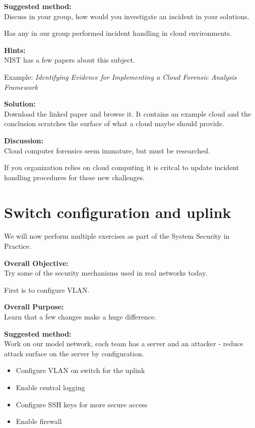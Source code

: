 \documentclass[a4paper,11pt,notitlepage]{report}
\begin{document}
{\bf Suggested method:}\\
Discuss in your group, how would you investigate an incident in your solutions.

Has any in our group performed incident handling in cloud environments.

{\bf Hints:}\\
NIST has a few papers about this subject.

Example:
\emph{Identifying Evidence for Implementing a Cloud Forensic Analysis Framework}

{\bf Solution:}\\
Download the linked paper and browse it. It contains an example cloud and the conclusion scratches the surface of what a cloud maybe should provide.

{\bf Discussion:}\\
Cloud computer forensics seem immature, but must be researched.

If you organization relies on cloud computing it is critcal to update incident handling procedures for these new challenges.




\chapter{Switch configuration and uplink}
\label{ex:switch-config-vlan}

We will now perform multiple exercises as part of the System Security in Practice.

{\bf Overall Objective:}\\
Try some of the security mechanisms used in real networks today.

First is to configure VLAN.

{\bf Overall Purpose:}\\
Learn that a few changes make a huge difference.

{\bf Suggested method:}\\
Work on our model network, each team has a server and an attacker - reduce attack surface on the server by configuration.

\begin{itemize}
\item Configure VLAN on switch for the uplink
\item Enable central logging
\item Configure SSH keys for more secure access
\item Enable firewall
\end{itemize}
\end{document}
